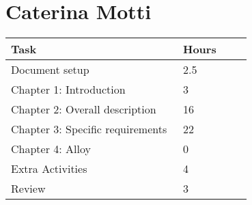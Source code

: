 \section{Caterina Motti}
\begin{center}
	\begin{tabular}{@{}p{0.5\linewidth} p{0.2\linewidth}@{}}
		\hline
		\textbf{Task} & \textbf{Hours} \\ \hline
            Document setup & 2.5 \\ \hline
            Chapter 1: Introduction & 3 \\ \hline
            Chapter 2: Overall description & 16 \\ \hline
            Chapter 3: Specific requirements & 22 \\ \hline
            Chapter 4: Alloy & 0 \\ \hline
            Extra Activities & 4 \\ \hline
            Review & 3 \\ \hline
	\end{tabular}
\end{center}
